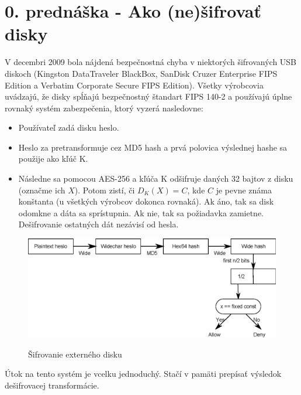 \section{0. prednáška - Ako (ne)šifrovať disky}

V decembri 2009 bola nájdená bezpečnostná chyba v niektorých šifrovaných USB diskoch
(Kingston DataTraveler BlackBox, SanDisk Cruzer Enterprise FIPS Edition a
Verbatim Corporate Secure FIPS Edition). Všetky výrobcovia uvádzajú, že disky
spĺňajú bezpečnostný štandart FIPS 140-2 a používajú úplne rovnaký systém zabezpečenia,
ktorý vyzerá nasledovne:
\begin{itemize}
\item Používateľ zadá disku heslo.
\item Heslo za pretransformuje cez MD5 hash a prvá polovica výslednej hashe sa použije ako kľúč K.
\item Následne sa pomocou AES-256 a kľúča K odšifruje daných 32 bajtov z disku (označme ich $X$). Potom zistí, či
$D_K(X)=C$, kde $C$ je pevne známa konštanta (u všetkých výrobcov dokonca rovnaká). Ak áno, tak sa disk odomkne a dáta sa sprístupnia.
Ak nie, tak sa požiadavka zamietne. Dešifrovanie ostatných dát nezávisí od hesla.
\end{itemize}

\begin{figure}[htp]
    \centering
    \includegraphics[scale=0.75]{img/00/extern_drive_encryption}
    \label{fig:extern_drive_encryption}
    \caption{Šifrovanie externého disku}
\end{figure}

Útok na tento systém je vcelku jednoduchý. Stačí v pamäti prepísať výsledok dešifrovacej transformácie. 



